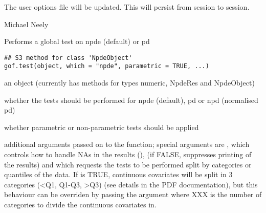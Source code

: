 \documentclass[a4paper]{book}
\begin{document}
%
\begin{Value}
The user options file will be updated.  This will persist from session to session.
\end{Value}
%
\begin{Author}\relax
Michael Neely
\end{Author}
%
\begin{Description}\relax
Performs a global test on npde (default) or pd
\end{Description}
%
\begin{Usage}
\begin{verbatim}
## S3 method for class 'NpdeObject'
gof.test(object, which = "npde", parametric = TRUE, ...)
\end{verbatim}
\end{Usage}
%
\begin{Arguments}
\begin{ldescription}
\item[\code{object}] an object (currently has methods for types numeric, NpdeRes and NpdeObject)

\item[\code{which}] whether the tests should be performed for npde (default), pd or npd (normalised pd)

\item[\code{parametric}] whether parametric or non-parametric tests should be applied

\item[\code{...}] additional arguments passed on to the function; special arguments are , which controls how to handle NAs in the results (),  (if FALSE, suppresses printing of the results) and  which requests the tests to be performed split by categories or quantiles of the data. If  is TRUE, continuous covariates will be split in 3 categories (<Q1, Q1-Q3, >Q3) (see details in the PDF documentation), but this behaviour can be overriden by passing the argument  where XXX is the number of categories to divide the continuous covariates in.
\end{ldescription}
\end{Arguments}
%
\end{document}
